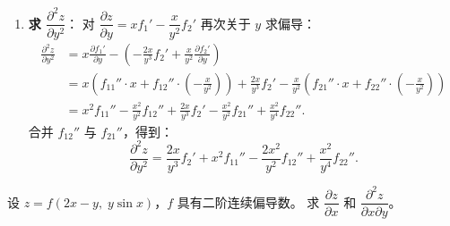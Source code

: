 \documentclass[lang=cn,11pt]{elegantbook}
\begin{document}
\begin{solution}
\begin{enumerate}
  \item \textbf{求 $\dfrac{\partial^2 z}{\partial y^2}$}：
  对 $\dfrac{\partial z}{\partial y}=xf_1'-\dfrac{x}{y^2}f_2'$ 再次关于 $y$ 求偏导：
  \begin{align*}
  \frac{\partial^2 z}{\partial y^2} &= x\frac{\partial f_1'}{\partial y} - \left(-\frac{2x}{y^3}f_2'+\frac{x}{y^2}\frac{\partial f_2'}{\partial y}\right) \\
  &= x\!\left(f_{11}''\cdot x+f_{12}''\cdot\left(-\frac{x}{y^2}\right)\right) + \frac{2x}{y^3}f_2' - \frac{x}{y^2}\!\left(f_{21}''\cdot x+f_{22}''\cdot\left(-\frac{x}{y^2}\right)\right) \\
  &= x^2f_{11}''-\frac{x^2}{y^2}f_{12}''+\frac{2x}{y^3}f_2'-\frac{x^2}{y^2}f_{21}''+\frac{x^2}{y^4}f_{22}''.
  \end{align*}
  合并 $f_{12}''$ 与 $f_{21}''$，得到：
  \[
  \boxed{\frac{\partial^2 z}{\partial y^2}=\frac{2x}{y^3}f_2'+x^2f_{11}''-\frac{2x^2}{y^2}f_{12}''+\frac{x^2}{y^4}f_{22}''}.
  \]
\end{enumerate}
\end{solution}

\begin{exercise}[另一个抽象复合函数] \label{ex:chain-2nd-order-2}
设 $z=f(2x-y,\;y\sin x)$，$f$ 具有二阶连续偏导数。
求 $\dfrac{\partial z}{\partial x}$ 和 $\dfrac{\partial^2 z}{\partial x\partial y}$。
\end{exercise}
\end{document}
